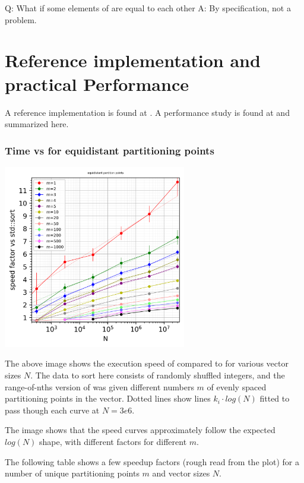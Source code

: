 Q: What if some elements of  are equal to each other A: By specification, not a problem.

\section{Reference implementation and practical Performance}

A reference implementation is found at \cite{p2375src}. A performance study is found at \cite{p2375RefImpl} and summarized here. 

\subsubsection*{Time vs  for equidistant partitioning points}

\begin{center}
\includegraphics[width=0.6\textwidth]{plotting/images/partition_points_equidistant_speed_for_n_vs_sort.png}
\end{center}

The above image shows the execution speed of  compared to  for various vector sizes $N$.
The data to sort here consists of randomly shuffled integers, and the range-of-nths version of  was given different numbers $m$ of evenly spaced partitioning points in the vector. Dotted lines show lines $k_i \cdot log(N)$ fitted to pass though each curve at $N=3e6$.

The image shows that the speed curves approximately follow the expected $log(N)$ shape, with different factors for different $m$.

The following table shows a few speedup factors (rough read from the plot) for a number of unique partitioning points $m$ and vector sizes $N$.

